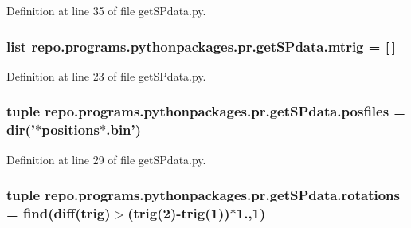 Definition at line 35 of file get\-S\-Pdata.\-py.

\hypertarget{namespacerepo_1_1programs_1_1pythonpackages_1_1pr_1_1getSPdata_a98628f2f931f1936c89b4f2c90610736}{
\subsubsection[{mtrig}]{\setlength{\rightskip}{0pt plus 5cm}list repo.\-programs.\-pythonpackages.\-pr.\-get\-S\-Pdata.\-mtrig = \mbox{[}$\,$\mbox{]}}}\label{namespacerepo_1_1programs_1_1pythonpackages_1_1pr_1_1getSPdata_a98628f2f931f1936c89b4f2c90610736}


Definition at line 23 of file get\-S\-Pdata.\-py.

\hypertarget{namespacerepo_1_1programs_1_1pythonpackages_1_1pr_1_1getSPdata_ab7bcb6dc1e35e343ea3d5a9f790c1f42}{
\subsubsection[{posfiles}]{\setlength{\rightskip}{0pt plus 5cm}tuple repo.\-programs.\-pythonpackages.\-pr.\-get\-S\-Pdata.\-posfiles = dir('$\ast$positions$\ast$.bin')}}\label{namespacerepo_1_1programs_1_1pythonpackages_1_1pr_1_1getSPdata_ab7bcb6dc1e35e343ea3d5a9f790c1f42}


Definition at line 29 of file get\-S\-Pdata.\-py.

\hypertarget{namespacerepo_1_1programs_1_1pythonpackages_1_1pr_1_1getSPdata_a3cd7917344307847daed23d1f68575c4}{
\subsubsection[{rotations}]{\setlength{\rightskip}{0pt plus 5cm}tuple repo.\-programs.\-pythonpackages.\-pr.\-get\-S\-Pdata.\-rotations = find(diff({\bf trig})$>$({\bf trig}(2)-\/{\bf trig}(1))$\ast$1.,1)}}\label{namespacerepo_1_1programs_1_1pythonpackages_1_1pr_1_1getSPdata_a3cd7917344307847daed23d1f68575c4}


